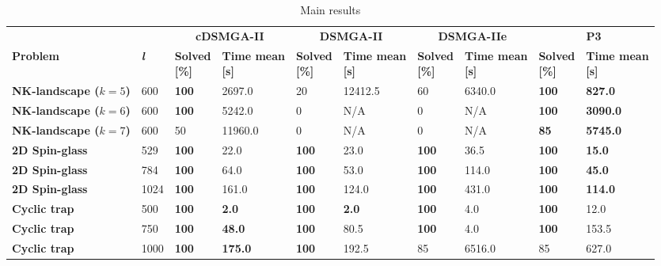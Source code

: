 \begin{table*}
	\caption{Main results}
	\label{tab:mainResults}
	\begin{tabular}{llllllllll}
		\toprule
		& & \multicolumn{2}{c}{\textbf{cDSMGA-II}} & \multicolumn{2}{c}{\textbf{DSMGA-II}} & \multicolumn{2}{c}{\textbf{DSMGA-IIe}} & \multicolumn{2}{c}{\textbf{P3}} \\
		\textbf{Problem} & \textbf{\textit{l}} & \pbox{20cm}{\textbf{Solved} \\ \textbf{[\%]}} & \pbox{20cm}{\textbf{Time mean} \\ \textbf{[s]}} & \pbox{20cm}{\textbf{Solved} \\ \textbf{[\%]}} & \pbox{20cm}{\textbf{Time mean} \\ \textbf{[s]}} & \pbox{20cm}{\textbf{Solved} \\ \textbf{[\%]}} & \pbox{20cm}{\textbf{Time mean} \\ \textbf{[s]}} & \pbox{20cm}{\textbf{Solved} \\ \textbf{[\%]}} & \pbox{20cm}{\textbf{Time mean} \\ \textbf{[s]}} \\
		\midrule
		\textbf{NK-landscape ($k = 5$)} & 600 & \textbf{100} & 2697.0 & 20 & 12412.5 & 60 & 6340.0 & \textbf{100} & \textbf{827.0} \\
		\textbf{NK-landscape ($k = 6$)} & 600 & \textbf{100} & 5242.0 & 0 & N/A & 0 & N/A & \textbf{100} & \textbf{3090.0} \\
		\textbf{NK-landscape ($k = 7$)} & 600 & 50 & 11960.0 & 0 & N/A & 0 & N/A & \textbf{85} & \textbf{5745.0} \\
		\textbf{2D Spin-glass} & 529 & \textbf{100} & 22.0 & \textbf{100} & 23.0 & \textbf{100} & 36.5 & \textbf{100} & \textbf{15.0} \\
		\textbf{2D Spin-glass} & 784 & \textbf{100} & 64.0 & \textbf{100} & 53.0 & \textbf{100} & 114.0 & \textbf{100} & \textbf{45.0} \\
		\textbf{2D Spin-glass} & 1024 & \textbf{100} & 161.0 & \textbf{100} & 124.0 & \textbf{100} & 431.0 & \textbf{100} & \textbf{114.0} \\
		\textbf{Cyclic trap} & 500 & \textbf{100} & \textbf{2.0} & \textbf{100} & \textbf{2.0} & \textbf{100} & 4.0 & \textbf{100} & 12.0 \\
		\textbf{Cyclic trap} & 750 & \textbf{100} & \textbf{48.0} & \textbf{100} & 80.5 & \textbf{100} & 4.0 & \textbf{100} & 153.5 \\
		\textbf{Cyclic trap} & 1000 & \textbf{100} & \textbf{175.0} & \textbf{100} & 192.5 & 85 & 6516.0 & 85 & 627.0 \\

\end{tabular}
\end{table*}
